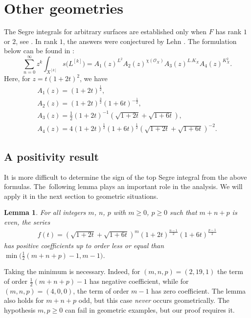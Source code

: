 \documentclass[11pt]{article}
\numberwithin{equation}{section}
\numberwithin{equation}{section}
\newtheorem{Lemma}[Theorem]{Lemma}
\begin{document}
\setcounter{section}{3}
\section{Other geometries} \label{secother}
The Segre integrals for arbitrary surfaces are established only when $F$ has rank $1$ or $2$, see \cite{MOP1, MOP}. In rank $1$, the answers were conjectured by Lehn \cite{Le}. The formulation below can be found in \cite{MOP}:
\begin{equation}\label{lehnc}
\sum_{n=0}^{\infty} z^k \int_{X^{[k]}} s\big(L^{[k]}\big) = A_1 (z)^{L^2} A_2(z)^{\chi(\mathcal O_X)} A_3 (z)^{L.K_X} A_4(z)^{K_X^2}.
\end{equation}
Here, for $z=t(1+2t)^2$, we have
\begin{gather*}
A_1(z)=(1+2t)^{\frac{1}{2}},
\\
A_2(z)=(1+2t)^{\frac{3}{2}} (1+6t)^{-\frac{1}{2}},
\\
A_3(z)=\frac{1}{2} (1+2t)^{-1} \left(\sqrt{1+2t}+\sqrt{1+6t}\right),
\\
 A_4(z)=4 (1+2t)^{\frac{1}{2}} (1+6t)^{\frac{1}{2}} \left(\sqrt{1+2t}+\sqrt{1+6t}\right)^{-2}.
 \end{gather*}

\subsection{A positivity result} It is more difficult to determine the sign of the top Segre integral from the above formulas. The~following lemma plays an important role in the analysis. We will apply it in the next section to geometric situations.

\begin{Lemma}\label{cl}
For all integers $m$, $n$, $p$ with $m\geq 0$, $p\geq 0$ such that $m+n+p$ is even, the series
\begin{gather*}
f(t)=\left(\sqrt{1+2t}+\sqrt{1+6t}\right)^m {(1+2t)}^{\frac{n-1}{2}} (1+6t)^{\frac{p-1}{2}}
\end{gather*}
has positive coefficients up to order less or equal than $\min\big(\frac{1}{2}(m+n+p)-1, m-1\big)$.
\end{Lemma}
Taking the minimum is necessary. Indeed, for $(m, n, p)=(2, 19, 1)$ the term of order $\frac{1}{2}(m+n+p)-1$ has negative coefficient, while for $(m, n, p)=(4, 0, 0)$, the term of order $m-1$ has zero coefficient. The lemma also holds for $m+n+p$ odd, but this case {\it never} occurs geometrically. The hypothesis $m, p\geq 0$ can fail in geometric examples, but our proof requires it.
\end{document}
